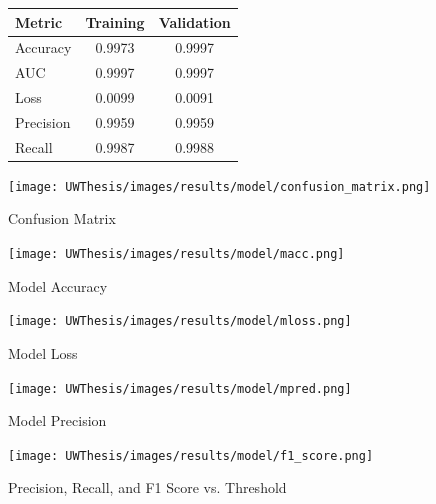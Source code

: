 \documentclass [11pt, proquest] {uwthesis}[2020/02/24]
\begin{document}
\begin{figure}[H]
\begin{minipage}[b]{0.48\textwidth}
\centering
\begin{tabular}{lcc}
\hline
\textbf{Metric} & \textbf{Training} & \textbf{Validation} \\
\hline
Accuracy & 0.9973 & 0.9997 \\
AUC & 0.9997 & 0.9997 \\
Loss & 0.0099 & 0.0091 \\
Precision & 0.9959 & 0.9959 \\
Recall & 0.9987 & 0.9988 \\
\hline
\end{tabular}
\label{tab:model-evaluation-metrics}
\end{minipage}
\hfill
\begin{minipage}[b]{0.48\textwidth}
\centering
\texttt{[image: UWThesis/images/results/model/confusion\_matrix.png]}
\caption{Confusion Matrix}
\label{fig:threshold-vs-metrics}
\end{minipage}
\end{figure}

\begin{figure}[H]
  \centering
  \begin{minipage}{0.48\textwidth}
    \centering
    \texttt{[image: UWThesis/images/results/model/macc.png]}
    \caption{Model Accuracy}
    \label{fig:model_accuracy}
  \end{minipage}
  \hfill
  \begin{minipage}{0.48\textwidth}
    \centering
    \texttt{[image: UWThesis/images/results/model/mloss.png]}
    \caption{Model Loss}
    \label{fig:model_loss}
  \end{minipage}
\end{figure}

\begin{figure}[h]
  \centering
  \begin{minipage}{0.48\textwidth}
    \centering
    \texttt{[image: UWThesis/images/results/model/mpred.png]}
    \caption{Model Precision}
    \label{fig:model_precision}
  \end{minipage}
  \hfill
  \begin{minipage}{0.48\textwidth}
    \centering
    \texttt{[image: UWThesis/images/results/model/f1\_score.png]}
    \caption{Precision, Recall, and F1 Score vs. Threshold}
    \label{fig:model_f1_threshold}
  \end{minipage}
\end{figure}
\end{document}
